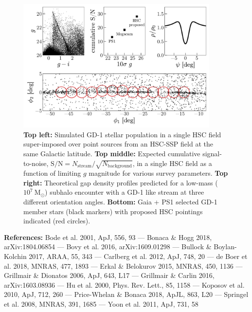 \documentclass[11pt]{article}
\begin{document}
\begin{figure}[t]
\begin{center}
\includegraphics[width=0.9\textwidth]{figure1.pdf}
\caption{
\textbf{Top left:} Simulated GD-1 stellar population in a single HSC field super-imposed over point sources from an HSC-SSP field at the same Galactic latitude.
\textbf{Top middle:} Expected cumulative signal-to-noise, $\textrm{S}/\textrm{N} = N_{\textrm{stream}} / \sqrt{N_{\textrm{background}}}$, in a single HSC field as a function of limiting $g$ magnitude for various survey parameters.
\textbf{Top right:} Theoretical gap density profiles predicted for a low-mass ($10^7~\textrm{M}_\odot$) subhalo encounter with a GD-1 like stream at three different orientation angles.
\textbf{Bottom:} Gaia + PS1 selected GD-1 member stars (black markers) with proposed HSC pointings indicated (red circles).
}
\label{fig:}
\end{center}
\end{figure}

\textbf{References:}
Bode et al. 2001, ApJ, 556, 93 ---
Bonaca \& Hogg 2018, arXiv:1804.06854 ---
Bovy et al. 2016, arXiv:1609.01298 ---
Bullock \& Boylan-Kolchin 2017, ARAA, 55, 343 ---
Carlberg et al. 2012, ApJ, 748, 20 ---
de Boer et al. 2018, MNRAS, 477, 1893 ---
Erkal \& Belokurov 2015, MNRAS, 450, 1136 ---
Grillmair \& Dionatos 2006, ApJ, 643, L17 ---
Grillmair \& Carlin 2016, arXiv:1603.08936 ---
Hu et al. 2000, Phys. Rev. Lett., 85, 1158 ---
Koposov et al. 2010, ApJ, 712, 260 ---
Price-Whelan \& Bonaca 2018, ApJL, 863, L20 ---
Springel et al. 2008, MNRAS, 391, 1685 ---
Yoon et al. 2011, ApJ, 731, 58
\end{document}
